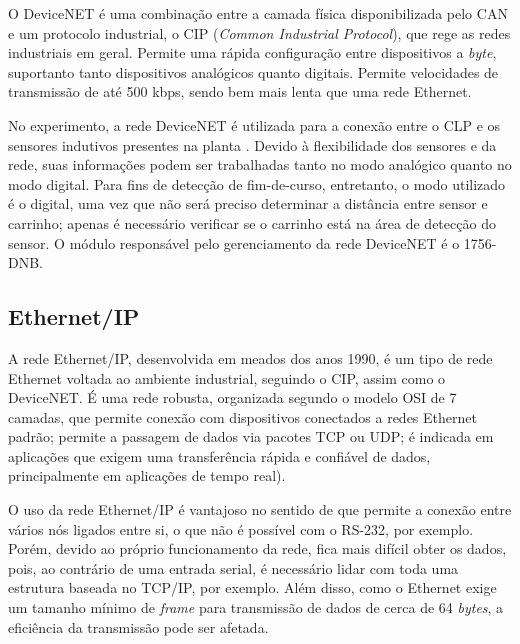 O DeviceNET é uma combinação entre a camada física disponibilizada pelo CAN e um protocolo industrial, o CIP (\textit{Common Industrial Protocol}), que rege as redes industriais em geral. Permite uma rápida configuração entre dispositivos a \textit{byte}, suportanto tanto dispositivos analógicos quanto digitais. Permite velocidades de transmissão de até 500 kbps, sendo bem mais lenta que uma rede Ethernet.

No experimento, a rede DeviceNET é utilizada para a conexão entre o CLP e os sensores indutivos presentes na planta \cite{redytton}. Devido à flexibilidade dos sensores e da rede, suas informações podem ser trabalhadas tanto no modo analógico quanto no modo digital. Para fins de detecção de fim-de-curso, entretanto, o modo utilizado é o digital, uma vez que não será preciso determinar a distância entre sensor e carrinho; apenas é necessário verificar se o carrinho está na área de detecção do sensor. O módulo responsável pelo gerenciamento da rede DeviceNET é o 1756-DNB.

\begin{comment}
https://en.wikipedia.org/wiki/DeviceNet
http://ab.rockwellautomation.com/Networks-and-Communications/DeviceNet-Network
http://www.rtaautomation.com/technologies/devicenet/
https://www.odva.org/Portals/0/Library/Publications_Numbered/PUB00122R1_CIP_Brochure_ENGLISH.pdf
\end{comment}

\subsection{Ethernet/IP}
A rede Ethernet/IP, desenvolvida em meados dos anos 1990, é um tipo de rede Ethernet voltada ao ambiente industrial, seguindo o CIP, assim como o DeviceNET. É uma rede robusta, organizada segundo o modelo OSI de 7 camadas, que permite conexão com dispositivos conectados a redes Ethernet padrão; permite a passagem de dados via pacotes TCP ou UDP; é indicada em aplicações que exigem uma transferência rápida e confiável de dados, principalmente em aplicações de tempo real).

O uso da rede Ethernet/IP é vantajoso no sentido de que permite a conexão entre vários nós ligados entre si, o que não é possível com o RS-232, por exemplo. Porém, devido ao próprio funcionamento da rede, fica mais difícil obter os dados, pois, ao contrário de uma entrada serial, é necessário lidar com toda uma estrutura baseada no TCP/IP, por exemplo. Além disso, como o Ethernet exige um tamanho mínimo de \textit{frame} para transmissão de dados de cerca de 64 \textit{bytes}, a eficiência da transmissão pode ser afetada.

